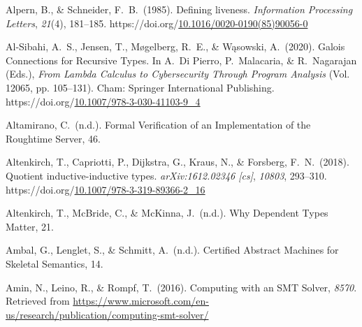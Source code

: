 \documentclass[12pt,twoside]{article}
\begin{document}
{\begin{thebibliography}{1079}
\mdbibitemlabel{}Alpern, B., \& Schneider, F.~B.~(1985). Defining liveness. \emph{Information Processing Letters}, \emph{21}(4), 181–185. https://doi.org/\href{https://dx.doi.org/10.1016/0020-0190\%252885\%252990056-0}{10.1016/0020-0190(85)90056-0}%

\mdbibitemlabel{}Al-Sibahi, A.~S., Jensen, T., Møgelberg, R.~E., \& Wąsowski, A.~(2020). Galois Connections for Recursive Types. In A.~Di Pierro, P.~Malacaria, \& R.~Nagarajan (Eds.), \emph{From Lambda Calculus to Cybersecurity Through Program Analysis} (Vol. 12065, pp. 105–131). Cham: Springer International Publishing. https://doi.org/\href{https://dx.doi.org/10.1007/978-3-030-41103-9_4}{10.1007/978-3-030-41103-9\_4}%

\mdbibitemlabel{}Altamirano, C.~(n.d.). Formal Verification of an Implementation of the Roughtime Server, 46.%

\mdbibitemlabel{}Altenkirch, T., Capriotti, P., Dijkstra, G., Kraus, N., \& Forsberg, F.~N.~(2018). Quotient inductive-inductive types. \emph{arXiv:1612.02346 {}[cs]}, \emph{10803}, 293–310. https://doi.org/\href{https://dx.doi.org/10.1007/978-3-319-89366-2_16}{10.1007/978-3-319-89366-2\_16}%

\mdbibitemlabel{}Altenkirch, T., McBride, C., \& McKinna, J.~(n.d.). Why Dependent Types Matter, 21.%

\mdbibitemlabel{}Ambal, G., Lenglet, S., \& Schmitt, A.~(n.d.). Certified Abstract Machines for Skeletal Semantics, 14.%

\mdbibitemlabel{}Amin, N., Leino, R., \& Rompf, T.~(2016). Computing with an SMT Solver, \emph{8570}. Retrieved from \href{https://www.microsoft.com/en-us/research/publication/computing-smt-solver/}{{\ttfamily https://\hspace{0pt}www.\hspace{0pt}microsoft.\hspace{0pt}com/\hspace{0pt}en-\hspace{0pt}us/\hspace{0pt}research/\hspace{0pt}publication/\hspace{0pt}computing-\hspace{0pt}smt-\hspace{0pt}solver/\hspace{0pt}}}%


\end{thebibliography}}
\end{document}

